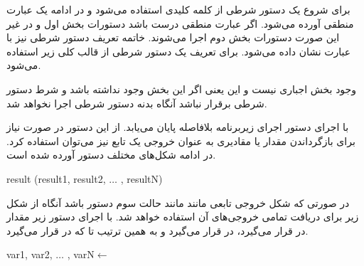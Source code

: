 \begin{latin}
\begin{algorithmic}[1]
	\State	{}
\EndWhile
\end{algorithmic}
\end{latin}


برای شروع یک دستور شرطی از کلمه کلیدی {} استفاده می‌شود و در ادامه یک عبارت منطقی آورده می‌شود. اگر عبارت منطقی درست باشد دستورات بخش اول و در غیر این صورت دستورات بخش دوم اجرا می‌شوند. خاتمه تعریف دستور شرطی نیز با  عبارت {} نشان داده می‌شود. برای تعریف یک دستور شرطی از قالب کلی زیر استفاده می‌شود.

\begin{latin}
\begin{algorithmic}[1]
	\State	{}
\Else
	\State	{}
\EndIf
\end{algorithmic}
\end{latin}

وجود بخش {} اجباری نیست و این یعنی اگر این بخش وجود نداشته باشد و شرط دستور شرطی برقرار نباشد آنگاه بدنه دستور شرطی اجرا نخواهد شد.


با اجرای دستور {} اجرای زیربرنامه بلافاصله پایان می‌یابد. از این دستور در صورت نیاز برای بازگرداندن مقدار یا مقادیری به عنوان خروجی یک تابع نیز می‌توان استفاده کرد. در ادامه شکل‌های مختلف دستور {} آورده شده است.

\begin{latin}
\begin{algorithmic}[1]
\State	\Return
\State	\Return result
\State	\Return (result1, result2, $\ldots$ , resultN)
\end{algorithmic}
\end{latin}

در صورتی که شکل خروجی تابعی مانند {} مانند حالت سوم دستور {} باشد آنگاه از شکل زیر برای دریافت تمامی خروجی‌های آن استفاده خواهد شد. با اجرای دستور زیر مقدار {} در {} قرار می‌گیرد، {} در {} قرار می‌گیرد و به همین ترتیب تا {} که در {} قرار می‌گیرد.

\begin{latin}
\begin{algorithmic}[1]
\State	var1, var2, $\ldots$ , varN$\gets$
\end{algorithmic}
\end{latin}


